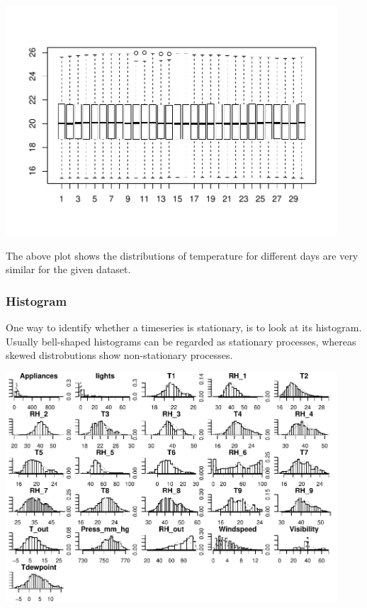 \documentclass[]{article}
\newenvironment{Shaded}{\begin{snugshade}}{\end{snugshade}}
\newcommand{\KeywordTok}[1]{\textcolor[rgb]{0.13,0.29,0.53}{\textbf{#1}}}
\newcommand{\StringTok}[1]{\textcolor[rgb]{0.31,0.60,0.02}{#1}}
\newcommand{\CommentTok}[1]{\textcolor[rgb]{0.56,0.35,0.01}{\textit{#1}}}
\newcommand{\OperatorTok}[1]{\textcolor[rgb]{0.81,0.36,0.00}{\textbf{#1}}}
\newcommand{\NormalTok}[1]{#1}
\begin{document}
\includegraphics[width=468]{README_figs/README-unnamed-chunk-7-1}

The above plot shows the distributions of temperature for different days
are very similar for the given dataset.

\subsubsection{Histogram}\label{histogram}

One way to identify whether a timeseries is stationary, is to look at
its histogram. Usually bell-shaped histograms can be regarded as
stationary processes, whereas skewed distrobutions show non-stationary
processes.

\begin{Shaded}
\end{Shaded}

\includegraphics[width=468]{README_figs/README-unnamed-chunk-8-1}
\end{document}
